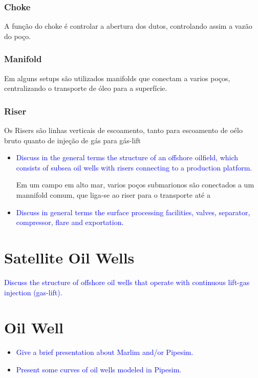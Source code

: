 \subsubsection{Choke}
A função do choke é controlar a abertura dos dutos, controlando assim a vazão do poço.

\subsubsection{Manifold}
Em alguns setups são utilizados manifolds que conectam a varios poços, centralizando o transporte de óleo para a superfície.


\subsubsection{Riser}
Os Risers são linhas verticais de escoamento, tanto para escoamento de oélo bruto quanto de injeção de gás para gás-lift


\begin{itemize}

\item \textcolor{blue}{Discuss in the general terms the structure of an offshore oilfield, which consists of subsea oil wells with risers connecting to a production platform.}

Em um campo em alto mar, varios poços submarionos são conectados a um mannifold comum, que liga-se ao riser para o transporte até a 

\item \textcolor{blue}{Discuss in general terms the surface processing facilities, valves, separator, compressor, flare and exportation.}

\end{itemize}


\section{Satellite Oil Wells}

\textcolor{blue}{Discuss the structure of offshore oil wells that operate with continuous lift-gas injection (gas-lift).}



\section{Oil Well}


\begin{itemize}

\item \textcolor{blue}{Give a brief presentation about Marlim and/or Pipesim.}

\item \textcolor{blue}{Present some curves of oil wells modeled in Pipesim.}


\end{itemize}

